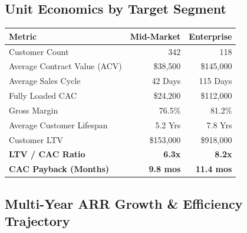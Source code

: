 \documentclass[10pt,a4paper]{article}
\begin{document}
\begin{minipage}[t]{0.49\textwidth}
  \subsection{Unit Economics by Target Segment}
  \vspace{-2pt}
  \begin{tcolorbox}[tablebox]
    \small
    \begin{tabularx}{\textwidth}{X r r}
      \toprule
      \textbf{Metric} & \textbf{Mid-Market} & \textbf{Enterprise} \\
      \midrule
      Customer Count & 342 & 118 \\
      Average Contract Value (ACV) & \$38,500 & \$145,000 \\
      Average Sales Cycle & 42 Days & 115 Days \\
      Fully Loaded CAC & \$24,200 & \$112,000 \\
      Gross Margin & 76.5\% & 81.2\% \\
      Average Customer Lifespan & 5.2 Yrs & 7.8 Yrs \\
      Customer LTV & \$153,000 & \$918,000 \\
      \midrule
      \textbf{LTV / CAC Ratio} & \textbf{6.3x} & \textbf{8.2x} \\
      \textbf{CAC Payback (Months)} & \textbf{9.8 mos} & \textbf{11.4 mos} \\
      \bottomrule
    \end{tabularx}
  \end{tcolorbox}
\end{minipage}

\vspace{12pt}

\subsection{Multi-Year ARR Growth \& Efficiency Trajectory}
\end{document}
